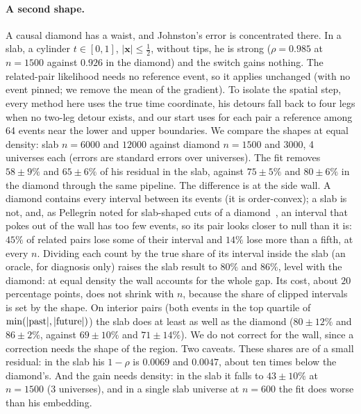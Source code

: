 \documentclass[11pt,a4paper]{article}
\begin{document}
\paragraph{A second shape.} A causal diamond has a waist, and Johnston's error is concentrated there. In a slab, a cylinder $t\in[0,1]$, $|\mathbf x|\le\tfrac12$, without tips, he is strong ($\rho=0.985$ at $n=1500$ against $0.926$ in the diamond) and the switch gains nothing. The related-pair likelihood needs no reference event, so it applies unchanged (with no event pinned; we remove the mean of the gradient). To isolate the spatial step, every method here uses the true time coordinate, his detours fall back to four legs when no two-leg detour exists, and our start uses for each pair a reference among 64 events near the lower and upper boundaries. We compare the shapes at equal density: slab $n=6000$ and $12000$ against diamond $n=1500$ and $3000$, 4 universes each (errors are standard errors over universes). The fit removes $58\pm9\%$ and $65\pm6\%$ of his residual in the slab, against $75\pm5\%$ and $80\pm6\%$ in the diamond through the same pipeline. The difference is at the side wall. A diamond contains every interval between its events (it is order-convex); a slab is not, and, as Pellegrin noted for slab-shaped cuts of a diamond~\cite{Pellegrin26}, an interval that pokes out of the wall has too few events, so its pair looks closer to null than it is: $45\%$ of related pairs lose some of their interval and $14\%$ lose more than a fifth, at every $n$. Dividing each count by the true share of its interval inside the slab (an oracle, for diagnosis only) raises the slab result to $80\%$ and $86\%$, level with the diamond: at equal density the wall accounts for the whole gap. Its cost, about $20$ percentage points, does not shrink with $n$, because the share of clipped intervals is set by the shape. On interior pairs (both events in the top quartile of $\min(|{\rm past}|,|{\rm future}|)$) the slab does at least as well as the diamond ($80\pm12\%$ and $86\pm2\%$, against $69\pm10\%$ and $71\pm14\%$). We do not correct for the wall, since a correction needs the shape of the region. Two caveats. These shares are of a small residual: in the slab his $1-\rho$ is $0.0069$ and $0.0047$, about ten times below the diamond's. And the gain needs density: in the slab it falls to $43\pm10\%$ at $n=1500$ (3 universes), and in a single slab universe at $n=600$ the fit does worse than his embedding.
\end{document}

